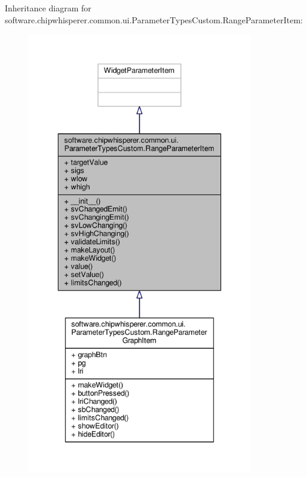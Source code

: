 Inheritance diagram for software.\+chipwhisperer.\+common.\+ui.\+Parameter\+Types\+Custom.\+Range\+Parameter\+Item\+:\nopagebreak
\begin{figure}[H]
\begin{center}
\leavevmode
\includegraphics[height=550pt]{da/de4/classsoftware_1_1chipwhisperer_1_1common_1_1ui_1_1ParameterTypesCustom_1_1RangeParameterItem__inherit__graph}
\end{center}
\end{figure}



